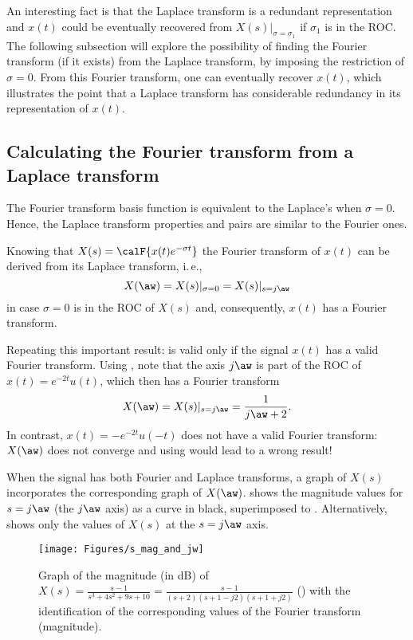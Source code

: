 An interesting fact is that the Laplace transform is a redundant representation and $x(t)$ could be eventually recovered from $X(s)|_{\sigma = \sigma_1}$ if $\sigma_1$ is in the ROC. The following subsection will explore the possibility of finding the Fourier transform (if it exists) from the Laplace transform, by imposing the restriction of $\sigma = 0$. From this Fourier transform, one can eventually recover $x(t)$, which illustrates the point that a Laplace transform has considerable redundancy in its representation of $x(t)$.

\subsection{Calculating the Fourier transform from a Laplace transform}
\label{sec:fourier_from_laplace}

The Fourier transform basis function is equivalent to the Laplace's when $\sigma=0$.
Hence, the Laplace transform properties and pairs are similar to the Fourier ones.

Knowing that $X(s) = \calF\{x(t) e^{-\sigma t}\}$ the Fourier transform of $x(t)$ can be derived from its Laplace transform, i.\,e., 
\begin{equation}
X(\aw)=X(s)|_{\sigma=0}=X(s)|_{s=j\aw}
\label{eq:fourierFromLaplace}
\end{equation}
in case $\sigma=0$ is in the ROC of $X(s)$ and, consequently, $x(t)$ has a Fourier transform. 

Repeating this important result:  is valid only if the signal $x(t)$ has a valid Fourier transform. Using , note that the axis $j \aw$ is part of the ROC of $x(t)=e^{-2t} u(t)$, which then has a Fourier transform
\[
X(\aw)=X(s)|_{s=j\aw}=\frac{1}{j\aw + 2}.
\]
In contrast, $x(t)=-e^{-2t} u(-t)$ does not have a valid Fourier transform: $X(\aw)$ does not converge and using  would lead to a wrong result!

When the signal has both Fourier and Laplace transforms, a graph of $X(s)$ incorporates the corresponding graph of $X(\aw)$.  shows the magnitude values for $s=j\aw$ (the $j\aw$ axis) as a curve in black, superimposed to . Alternatively,   shows only the values of $X(s)$ at the $s=j\aw$ axis.

\begin{figure}[!htb]
        \centering
                \texttt{[image: Figures/s\_mag\_and\_jw]}        
        \caption{Graph of the magnitude (in dB) of $X(s) =  \frac{s-1}{s^3+4s^2+9s+10} = \frac{s-1}{(s+2)(s+1-j2)(s+1+j2)}$ () with the identification of the corresponding values of the Fourier transform (magnitude).\label{fig:s_mag_and_jw}}
\end{figure}

